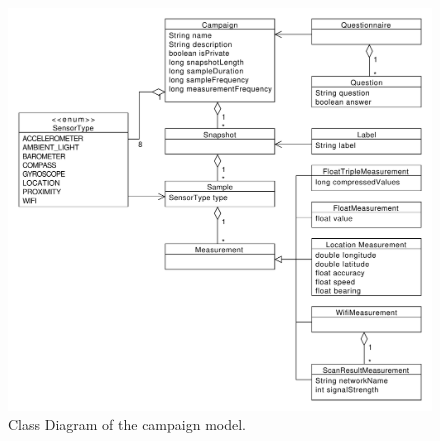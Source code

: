 \begin{figure}[!htbp]
    \centering
    \includegraphics[width=\textwidth]{graphic/data_modeling/model_class_diagram.pdf}
    \caption{Class Diagram of the campaign model.}
    \label{fig:model_class_diagram}
\end{figure}
\FloatBarrier

